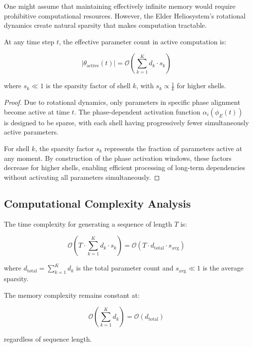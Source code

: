 One might assume that maintaining effectively infinite memory would require prohibitive computational resources. However, the Elder Heliosystem's rotational dynamics create natural sparsity that makes computation tractable.

\begin{theorem}
At any time step $t$, the effective parameter count in active computation is:

\begin{equation}
|\theta_{\text{active}}(t)| = \mathcal{O}(\sum_{k=1}^K d_k \cdot s_k)
\end{equation}

where $s_k \ll 1$ is the sparsity factor of shell $k$, with $s_k \propto \frac{1}{k}$ for higher shells.
\end{theorem}

\begin{proof}
Due to rotational dynamics, only parameters in specific phase alignment become active at time $t$. The phase-dependent activation function $\alpha_i(\phi_E(t))$ is designed to be sparse, with each shell having progressively fewer simultaneously active parameters.

For shell $k$, the sparsity factor $s_k$ represents the fraction of parameters active at any moment. By construction of the phase activation windows, these factors decrease for higher shells, enabling efficient processing of long-term dependencies without activating all parameters simultaneously.
\end{proof}

\subsection{Computational Complexity Analysis}

\begin{corollary}
The time complexity for generating a sequence of length $T$ is:

\begin{equation}
\mathcal{O}(T \cdot \sum_{k=1}^K d_k \cdot s_k) = \mathcal{O}(T \cdot d_{\text{total}} \cdot s_{\text{avg}})
\end{equation}

where $d_{\text{total}} = \sum_{k=1}^K d_k$ is the total parameter count and $s_{\text{avg}} \ll 1$ is the average sparsity.
\end{corollary}

\begin{corollary}
The memory complexity remains constant at:

\begin{equation}
\mathcal{O}(\sum_{k=1}^K d_k) = \mathcal{O}(d_{\text{total}})
\end{equation}

regardless of sequence length.
\end{corollary}


